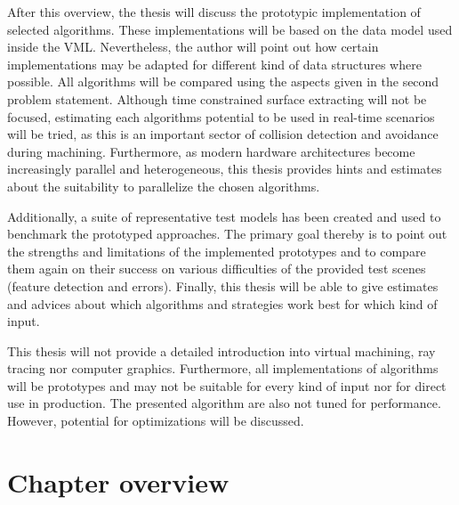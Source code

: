 After this overview, the thesis will discuss the prototypic implementation of selected algorithms.
These implementations will be based on the data model used inside the VML.
Nevertheless, the author will point out how certain implementations may be adapted for different kind of data structures where possible.
All algorithms will be compared using the aspects given in the second problem statement.
Although time constrained surface extracting will not be focused, estimating each algorithms potential to be used in real-time scenarios will be tried, as this is an important sector of collision detection and avoidance during machining.
Furthermore, as modern hardware architectures become increasingly parallel and heterogeneous, this thesis provides hints and estimates about the suitability to parallelize the chosen algorithms.

Additionally, a suite of representative test models has been created and used to benchmark the prototyped approaches.
The primary goal thereby is to point out the strengths and limitations of the implemented prototypes and to compare them again on their success on various difficulties of the provided test scenes (\eg feature detection and errors).
Finally, this thesis will be able to give estimates and advices about which algorithms and strategies work best for which kind of input.

This thesis will not provide a detailed introduction into virtual machining, ray tracing nor computer graphics.
Furthermore, all implementations of algorithms will be prototypes and may not be suitable for every kind of input nor for direct use in production.
The presented algorithm are also not tuned for performance.
However, potential for optimizations will be discussed.


\section{Chapter overview}
\label{sec:chapter_overview}

